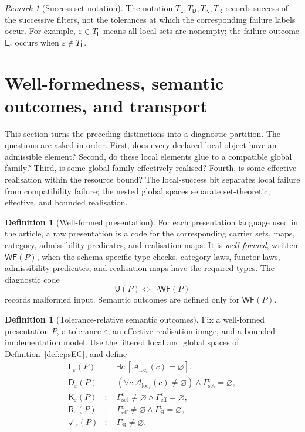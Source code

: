 \documentclass[11pt]{article}
\theoremstyle{plain}
\theoremstyle{definition}
\newtheorem{definition}[theorem]{Definition}
\theoremstyle{remark}
\newtheorem{remark}[theorem]{Remark}
\newcommand{\LocalAdm}{\mathcal{A}_{\mathrm{loc}}}
\newcommand{\eps}{\varepsilon}
\begin{document}
\begin{remark}[Success-set notation]
The notation $T_{\mathsf L},T_{\mathsf D},T_{\mathsf K},T_{\mathsf R}$ records
success of the successive filters, not the tolerances at which the corresponding
failure labels occur. For example, $\eps\in T_{\mathsf L}$ means all local sets
are nonempty; the failure outcome $\mathsf L_\eps$ occurs when
$\eps\notin T_{\mathsf L}$.
\end{remark}

\section{Well-formedness, semantic outcomes, and transport}\label{sec:ladder}

This section turns the preceding distinctions into a diagnostic partition. The
questions are asked in order. First, does every declared local object have an
admissible element? Second, do these local elements glue to a compatible global
family? Third, is some global family effectively realised? Fourth, is some
effective realisation within the resource bound? The local-success bit separates
local failure from compatibility failure; the nested global spaces separate
set-theoretic, effective, and bounded realisation.

\begin{definition}[Well-formed presentation]\label{def:levels}
For each presentation language used in the article, a raw presentation is a code for the
corresponding carrier sets, maps, category, admissibility predicates, and
realisation maps. It is \emph{well formed}, written $\mathsf{WF}(P)$, when the
schema-specific type checks, category laws, functor laws, admissibility
predicates, and realisation maps have the required types. The diagnostic code
\[
\mathsf U(P)\iff\neg\mathsf{WF}(P)
\]
records malformed input. Semantic outcomes are defined only for
$\mathsf{WF}(P)$.
\end{definition}

\begin{definition}[Tolerance-relative semantic outcomes]\label{def:first}
Fix a well-formed presentation $P$, a tolerance $\eps$, an effective
realisation image, and a bounded implementation model. Use the filtered local
and global spaces of Definition~\ref{def:epsEC}, and define
\begin{align*}
\mathsf L_\eps(P)&:\quad
 \exists c\ [\LocalAdm_\eps(c)=\varnothing],\\
\mathsf D_\eps(P)&:\quad
 (\forall c\ \LocalAdm_\eps(c)\ne\varnothing)
 \land\Gamma_{\mathrm{set}}^\eps=\varnothing,\\
\mathsf K_\eps(P)&:\quad
 \Gamma_{\mathrm{set}}^\eps\ne\varnothing
 \land\Gamma_{\mathrm{eff}}^\eps=\varnothing,\\
\mathsf R_\eps(P)&:\quad
 \Gamma_{\mathrm{eff}}^\eps\ne\varnothing
 \land\Gamma_{\mathcal B}^\eps=\varnothing,\\
\checkmark_\eps(P)&:\quad
 \Gamma_{\mathcal B}^\eps\ne\varnothing.
\end{align*}
\end{definition}
\end{document}
